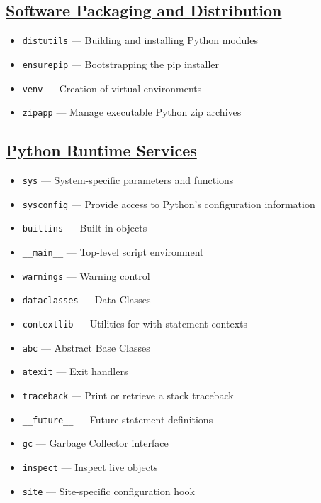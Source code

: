 \documentclass[]{book}
\providecommand{\tightlist}{%
  \setlength{\itemsep}{0pt}\setlength{\parskip}{0pt}}
\theoremstyle{definition}
\theoremstyle{definition}
\theoremstyle{definition}
\theoremstyle{remark}
\begin{document}
\subsection{\texorpdfstring{\href{https://docs.python.org/3.7/library/distribution.html}{Software
Packaging and
Distribution}}{Software Packaging and Distribution}}\label{software-packaging-and-distribution}

\begin{itemize}
\tightlist
\item
  \texttt{distutils} --- Building and installing Python modules
\item
  \texttt{ensurepip} --- Bootstrapping the pip installer
\item
  \texttt{venv} --- Creation of virtual environments
\item
  \texttt{zipapp} --- Manage executable Python zip archives
\end{itemize}

\subsection{\texorpdfstring{\href{https://docs.python.org/3.7/library/python.html}{Python
Runtime
Services}}{Python Runtime Services}}\label{python-runtime-services}

\begin{itemize}
\tightlist
\item
  \texttt{sys} --- System-specific parameters and functions
\item
  \texttt{sysconfig} --- Provide access to Python's configuration
  information
\item
  \texttt{builtins} --- Built-in objects
\item
  \texttt{\_\_main\_\_} --- Top-level script environment
\item
  \texttt{warnings} --- Warning control
\item
  \texttt{dataclasses} --- Data Classes
\item
  \texttt{contextlib} --- Utilities for with-statement contexts
\item
  \texttt{abc} --- Abstract Base Classes
\item
  \texttt{atexit} --- Exit handlers
\item
  \texttt{traceback} --- Print or retrieve a stack traceback
\item
  \texttt{\_\_future\_\_} --- Future statement definitions
\item
  \texttt{gc} --- Garbage Collector interface
\item
  \texttt{inspect} --- Inspect live objects
\item
  \texttt{site} --- Site-specific configuration hook
\end{itemize}
\end{document}
